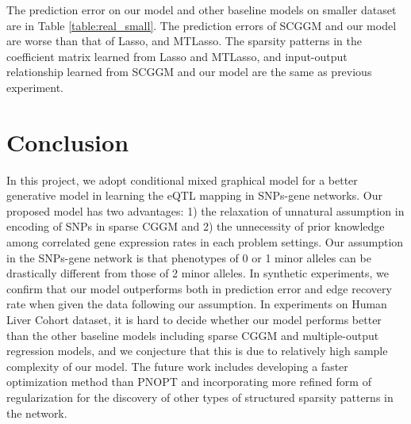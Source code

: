 \documentclass{article}
\begin{document}
The prediction error on our model and other baseline models on smaller dataset are in Table \ref{table:real_small}. The prediction errors of SCGGM and our model are worse than that of Lasso, and MTLasso. The sparsity patterns in the coefficient matrix learned from Lasso and MTLasso, and input-output relationship learned from SCGGM and our model are the same as previous experiment. 



\section{Conclusion}
In this project, we adopt conditional mixed graphical model for a better generative model in learning the eQTL mapping in SNPs-gene networks. Our proposed model has two advantages: 1) the relaxation of unnatural assumption in encoding of SNPs in sparse CGGM and 2) the unnecessity of prior knowledge among correlated gene expression rates in each problem settings. Our assumption in the SNPs-gene network is that phenotypes of 0 or 1 minor alleles can be drastically different from those of 2 minor alleles. In synthetic experiments, we confirm that our model outperforms both in prediction error and edge recovery rate when given the data following our assumption. In experiments on Human Liver Cohort dataset, it is hard to decide whether our model performs better than the other baseline models including sparse CGGM and multiple-output regression models, and we conjecture that this is due to relatively high sample complexity of our model. The future work includes developing a faster optimization method than PNOPT and incorporating more refined form of regularization for the discovery of other types of structured sparsity patterns in the network.





\nocite{*}


\end{document}

